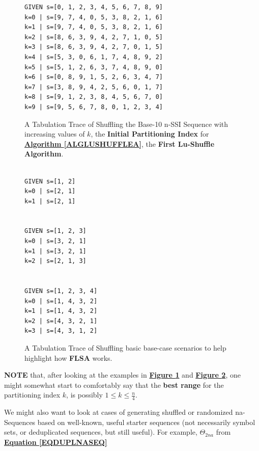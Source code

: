 \documentclass[a4paper, 18pt]{book} %
\begin{document}
\begin{figure}[H]
  \begin{center}
\Large
\begin{verbatim}
GIVEN s=[0, 1, 2, 3, 4, 5, 6, 7, 8, 9]
k=0 | s=[9, 7, 4, 0, 5, 3, 8, 2, 1, 6]
k=1 | s=[9, 7, 4, 0, 5, 3, 8, 2, 1, 6]
k=2 | s=[8, 6, 3, 9, 4, 2, 7, 1, 0, 5]
k=3 | s=[8, 6, 3, 9, 4, 2, 7, 0, 1, 5]
k=4 | s=[5, 3, 0, 6, 1, 7, 4, 8, 9, 2]
k=5 | s=[5, 1, 2, 6, 3, 7, 4, 8, 9, 0]
k=6 | s=[0, 8, 9, 1, 5, 2, 6, 3, 4, 7]
k=7 | s=[3, 8, 9, 4, 2, 5, 6, 0, 1, 7]
k=8 | s=[9, 1, 2, 3, 8, 4, 5, 6, 7, 0]
k=9 | s=[9, 5, 6, 7, 8, 0, 1, 2, 3, 4]
\end{verbatim}

   \caption{A Tabulation Trace of Shuffling the Base-10 n-SSI Sequence with increasing values of $k$, the \textbf{Initial Partitioning Index} for \textbf{\hyperref[ALGLUSHUFFLEA]{Algorithm \ref{ALGLUSHUFFLEA}}}, the \textbf{First Lu-Shuffle Algorithm}.}
  \label{FIGTRACEFLSA}
  \end{center}
\end{figure}


\begin{figure}[H]
  \begin{center}
\Large
\begin{verbatim}

GIVEN s=[1, 2]
k=0 | s=[2, 1]
k=1 | s=[2, 1]


GIVEN s=[1, 2, 3]
k=0 | s=[3, 2, 1]
k=1 | s=[3, 2, 1]
k=2 | s=[2, 1, 3]


GIVEN s=[1, 2, 3, 4]
k=0 | s=[1, 4, 3, 2]
k=1 | s=[1, 4, 3, 2]
k=2 | s=[4, 3, 2, 1]
k=3 | s=[4, 3, 1, 2]
\end{verbatim}

   \caption{A Tabulation Trace of Shuffling basic base-case scenarios to help highlight how \textbf{FLSA} works.}
  \label{FIGTRACEFLSASIMPLE}
  \end{center}
\end{figure}



\textbf{NOTE} that, after looking at the examples in \textbf{\hyperref[FIGTRACEFLSA]{Figure \ref{FIGTRACEFLSA}}} and \textbf{\hyperref[FIGTRACEFLSASIMPLE]{Figure \ref{FIGTRACEFLSASIMPLE}}}, one might somewhat start to comfortably say that the \textbf{best range} for the partitioning index $k$, is possibly $1 \leq k \leq \frac{n}{4}$.

We might also want to look at cases of generating shuffled or randomized na-Sequences based on well-known, useful starter sequences (not necessarily symbol sets, or deduplicated sequences, but still useful). For example, $\Theta_{2na}$ from \textbf{\hyperref[EQDUPLNASEQ]{Equation \ref{EQDUPLNASEQ}}}
\end{document}

